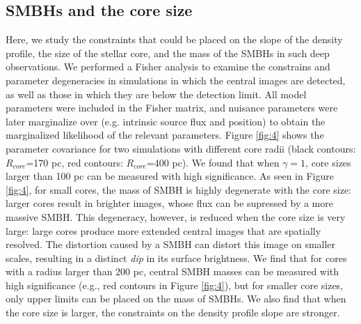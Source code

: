 \documentclass[chicago]{emulateapj}
\begin{document}
\subsection{SMBHs and the core size}
Here, we study the constraints that could be placed on the slope of the density profile, the size of the stellar core, and the mass of the SMBHs in such deep observations. 
We performed a Fisher analysis to examine the constrains and parameter degeneracies in simulations in which the central images are detected, as well as those in which they are below the detection limit. All model parameters were included in the Fisher matrix, and nuisance parameters were later marginalize over (e.g. intrinsic source flux and position) to obtain the marginalized likelihood of the relevant parameters.  
 Figure \ref{fig:4} shows the parameter covariance for two simulations with different core radii (black contours:  $R_{core}$=170 pc, red contours: $R_{core}$=400 pc).
We found that when $\gamma=1$, core sizes larger than 100 pc can be measured with high significance. As seen in Figure \ref{fig:4}, 
for small cores, the mass of SMBH is highly degenerate with the core size: larger cores result in brighter images, whose flux can be supressed by a more massive SMBH.
This degeneracy,  however,  is reduced when the core size is very large: large cores produce more extended central images that are spatially resolved. The distortion caused by a SMBH can distort this image on smaller scales, resulting in a distinct \emph{dip} in its surface brightness. %
We find that for cores with a radius larger than $200$ pc, central SMBH masses can be measured with high significance (e.g., red contours in Figure \ref{fig:4}), but for smaller core sizes, only upper limits can be placed on the mass of SMBHs.
We also find that when the core size is larger, the constraints on the density profile slope are stronger.

\end{document}
